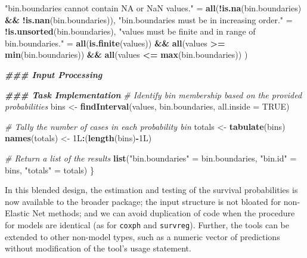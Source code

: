 \documentclass[
]{book}
\newenvironment{Shaded}{\begin{snugshade}}{\end{snugshade}}
\newcommand{\AttributeTok}[1]{\textcolor[rgb]{0.13,0.29,0.53}{#1}}
\newcommand{\CommentTok}[1]{\textcolor[rgb]{0.56,0.35,0.01}{\textit{#1}}}
\newcommand{\ConstantTok}[1]{\textcolor[rgb]{0.56,0.35,0.01}{#1}}
\newcommand{\DocumentationTok}[1]{\textcolor[rgb]{0.56,0.35,0.01}{\textbf{\textit{#1}}}}
\newcommand{\FunctionTok}[1]{\textcolor[rgb]{0.13,0.29,0.53}{\textbf{#1}}}
\newcommand{\NormalTok}[1]{#1}
\newcommand{\OtherTok}[1]{\textcolor[rgb]{0.56,0.35,0.01}{#1}}
\newcommand{\SpecialCharTok}[1]{\textcolor[rgb]{0.81,0.36,0.00}{\textbf{#1}}}
\newcommand{\StringTok}[1]{\textcolor[rgb]{0.31,0.60,0.02}{#1}}
\begin{document}
\begin{Shaded}
\begin{Highlighting}[]
    \StringTok{"\textasciigrave{}bin.boundaries\textasciigrave{} cannot contain NA or NaN values."} \OtherTok{=} 
      \FunctionTok{all}\NormalTok{(}\SpecialCharTok{!}\FunctionTok{is.na}\NormalTok{(bin.boundaries) }\SpecialCharTok{\&\&} \SpecialCharTok{!}\FunctionTok{is.nan}\NormalTok{(bin.boundaries)),}
    \StringTok{"\textasciigrave{}bin.boundaries\textasciigrave{} must be in increasing order."} \OtherTok{=} \SpecialCharTok{!}\FunctionTok{is.unsorted}\NormalTok{(bin.boundaries),}
    \StringTok{"\textasciigrave{}values\textasciigrave{} must be finite and in range of \textasciigrave{}bin.boundaries\textasciigrave{}."} \OtherTok{=} 
      \FunctionTok{all}\NormalTok{(}\FunctionTok{is.finite}\NormalTok{(values)) }\SpecialCharTok{\&\&} \FunctionTok{all}\NormalTok{(values }\SpecialCharTok{\textgreater{}=} \FunctionTok{min}\NormalTok{(bin.boundaries)) }\SpecialCharTok{\&\&} 
      \FunctionTok{all}\NormalTok{(values }\SpecialCharTok{\textless{}=} \FunctionTok{max}\NormalTok{(bin.boundaries))}
\NormalTok{  )}
  
  \DocumentationTok{\#\#\# Input Processing}
  
  \DocumentationTok{\#\#\# Task Implementation}
  \CommentTok{\# Identify bin membership based on the provided probabilities}
\NormalTok{  bins }\OtherTok{\textless{}{-}} \FunctionTok{findInterval}\NormalTok{(values, bin.boundaries, }\AttributeTok{all.inside =} \ConstantTok{TRUE}\NormalTok{)}
  
  \CommentTok{\# Tally the number of cases in each probability bin}
\NormalTok{  totals }\OtherTok{\textless{}{-}} \FunctionTok{tabulate}\NormalTok{(bins)}
  \FunctionTok{names}\NormalTok{(totals) }\OtherTok{\textless{}{-}}\NormalTok{ 1L}\SpecialCharTok{:}\NormalTok{(}\FunctionTok{length}\NormalTok{(bins)}\SpecialCharTok{{-}}\NormalTok{1L)}
  
  \CommentTok{\# Return a list of the results}
  \FunctionTok{list}\NormalTok{(}\StringTok{"bin.boundaries"} \OtherTok{=}\NormalTok{ bin.boundaries, }
       \StringTok{"bin.id"}         \OtherTok{=}\NormalTok{ bins, }
       \StringTok{"totals"}         \OtherTok{=}\NormalTok{ totals)}
\NormalTok{\}}
\end{Highlighting}
\end{Shaded}

In this blended design, the estimation and testing of the survival probabilities is now available to the broader package; the input structure is not bloated for non-Elastic Net methods; and we can avoid duplication of code when the procedure for models are identical (as for \texttt{coxph} and \texttt{survreg}). Further, the tools can be extended to other non-model types, such as a numeric vector of predictions without modification of the tool's usage statement.
\end{document}
